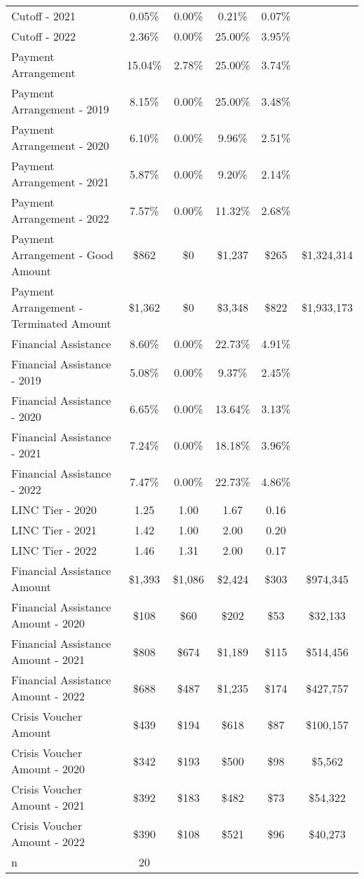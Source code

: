 \begin{tabular}{l|c|c|c|c|c}
\quad Cutoff - 2021 & 0.05\% & 0.00\% & 0.21\% & 0.07\% \\
\quad Cutoff - 2022 & 2.36\% & 0.00\% & 25.00\% & 3.95\% \\
\midrule 
Payment Arrangement & 15.04\% & 2.78\% & 25.00\% & 3.74\% \\
\quad Payment Arrangement - 2019 & 8.15\% & 0.00\% & 25.00\% & 3.48\% \\
\quad Payment Arrangement - 2020 & 6.10\% & 0.00\% & 9.96\% & 2.51\% \\
\quad Payment Arrangement - 2021 & 5.87\% & 0.00\% & 9.20\% & 2.14\% \\
\quad Payment Arrangement - 2022 & 7.57\% & 0.00\% & 11.32\% & 2.68\% \\
\quad Payment Arrangement - Good Amount & \$862 & \$0 & \$1,237 & \$265 & \$1,324,314 \\
\quad Payment Arrangement - Terminated Amount & \$1,362 & \$0 & \$3,348 & \$822 & \$1,933,173 \\
\midrule 
Financial Assistance & 8.60\% & 0.00\% & 22.73\% & 4.91\% \\
\quad Financial Assistance - 2019 & 5.08\% & 0.00\% & 9.37\% & 2.45\% \\
\quad Financial Assistance - 2020 & 6.65\% & 0.00\% & 13.64\% & 3.13\% \\
\quad Financial Assistance - 2021 & 7.24\% & 0.00\% & 18.18\% & 3.96\% \\
\quad Financial Assistance - 2022 & 7.47\% & 0.00\% & 22.73\% & 4.86\% \\
\midrule 
LINC Tier - 2020 & 1.25 & 1.00 & 1.67 & 0.16 \\
LINC Tier - 2021 & 1.42 & 1.00 & 2.00 & 0.20 \\
LINC Tier - 2022 & 1.46 & 1.31 & 2.00 & 0.17 \\
\midrule 
Financial Assistance Amount & \$1,393 & \$1,086 & \$2,424 & \$303 & \$974,345 \\
\quad Financial Assistance Amount - 2020 & \$108 & \$60 & \$202 & \$53 & \$32,133 \\
\quad Financial Assistance Amount - 2021 & \$808 & \$674 & \$1,189 & \$115 & \$514,456 \\
\quad Financial Assistance Amount - 2022 & \$688 & \$487 & \$1,235 & \$174 & \$427,757 \\
\midrule 
Crisis Voucher Amount & \$439 & \$194 & \$618 & \$87 & \$100,157 \\
\quad Crisis Voucher Amount - 2020 & \$342 & \$193 & \$500 & \$98 & \$5,562 \\
\quad Crisis Voucher Amount - 2021 & \$392 & \$183 & \$482 & \$73 & \$54,322 \\
\quad Crisis Voucher Amount - 2022 & \$390 & \$108 & \$521 & \$96 & \$40,273 \\
\midrule 
n & 20 &  &  &  &  \\
\midrule 
\bottomrule 
\end{tabular}
